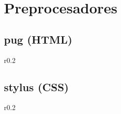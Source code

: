\chapter{Preprocesadores}

\section{pug (HTML)}

\lipsum[1]
\begin{wrapfigure}{r}{0.2\paperwidth}
	
\end{wrapfigure}
\lipsum[1]

\section{stylus (CSS)}

\lipsum[1]
\begin{wrapfigure}{r}{0.2\paperwidth}
	
\end{wrapfigure}
\lipsum[1]